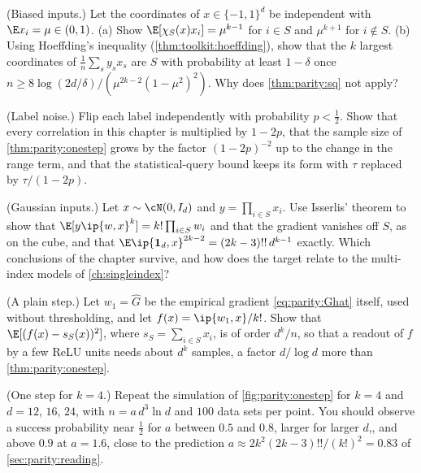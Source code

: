 \begin{refsection}
\begin{exercises}
\item \variation (Biased inputs.) Let the coordinates of $x\in\{-1,1\}^d$ be independent with $\E x_i=\mu\in(0,1)$. (a) Show $\E[\chi_S(x)x_i]=\mu^{k-1}$ for $i\in S$ and $\mu^{k+1}$ for $i\notin S$. (b) Using Hoeffding's inequality (\cref{thm:toolkit:hoeffding}), show that the $k$ largest coordinates of $\frac1n\sum_sy_sx_s$ are $S$ with probability at least $1-\delta$ once $n\ge8\log(2d/\delta)/(\mu^{2k-2}(1-\mu^2)^2)$. Why does \cref{thm:parity:sq} not apply?\label{ex:parity:biased}

\item \variation (Label noise.) Flip each label independently with probability $p<\frac12$. Show that every correlation in this chapter is multiplied by $1-2p$, that the sample size of \cref{thm:parity:onestep} grows by the factor $(1-2p)^{-2}$ up to the change in the range term, and that the statistical-query bound keeps its form with $\tau$ replaced by $\tau/(1-2p)$.\label{ex:parity:noise}

\item \variation (Gaussian inputs.) Let $x\sim\cN(0,I_d)$ and $y=\prod_{i\in S}x_i$. Use Isserlis' theorem to show that $\E[y\ip{w,x}^k]=k!\prod_{i\in S}w_i$ and that the gradient vanishes off $S$, as on the cube, and that $\E\ip{\mathbf 1_d,x}^{2k-2}=(2k-3)!!\,d^{k-1}$ exactly. Which conclusions of the chapter survive, and how does the target relate to the multi-index models of \cref{ch:singleindex}?\label{ex:parity:gauss}

\item \variation\hard (A plain step.) Let $w_1=\hat G$ be the empirical gradient \eqref{eq:parity:Ghat} itself, used without thresholding, and let $f(x)=\ip{w_1,x}/k!$. Show that $\E[(f(x)-s_S(x))^2]$, where $s_S=\sum_{i\in S}x_i$, is of order $d^k/n$, so that a readout of $f$ by a few ReLU units needs about $d^k$ samples, a factor $d/\log d$ more than \cref{thm:parity:onestep}. \label{ex:parity:linear}

\item \simulation (One step for $k=4$.) Repeat the simulation of \cref{fig:parity:onestep} for $k=4$ and $d=12$, $16$, $24$, with $n=a\,d^3\ln d$ and $100$ data sets per point. You should observe a success probability near $\frac12$ for $a$ between $0.5$ and $0.8$, larger for larger $d$,, and above $0.9$ at $a=1.6$, close to the prediction $a\approx2k^2(2k-3)!!/(k!)^2=0.83$ of \cref{sec:parity:reading}.\label{ex:parity:k4}


\end{exercises}
\end{refsection}
